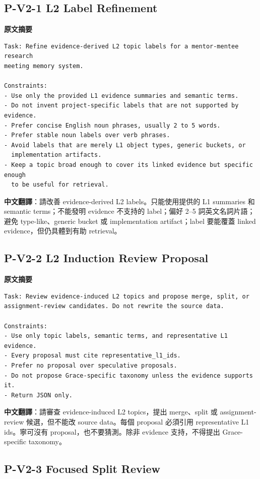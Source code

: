 \documentclass[11pt]{article}
\begin{document}
\subsection{P-V2-1 L2 Label Refinement}

\textbf{原文摘要}
\begin{Verbatim}
Task: Refine evidence-derived L2 topic labels for a mentor-mentee research
meeting memory system.

Constraints:
- Use only the provided L1 evidence summaries and semantic terms.
- Do not invent project-specific labels that are not supported by evidence.
- Prefer concise English noun phrases, usually 2 to 5 words.
- Prefer stable noun labels over verb phrases.
- Avoid labels that are merely L1 object types, generic buckets, or
  implementation artifacts.
- Keep a topic broad enough to cover its linked evidence but specific enough
  to be useful for retrieval.
\end{Verbatim}

\textbf{中文翻譯}：請改善 evidence-derived L2 labels。只能使用提供的 L1 summaries 和 semantic terms；不能發明 evidence 不支持的 label；偏好 2--5 詞英文名詞片語；避免 type-like、generic bucket 或 implementation artifact；label 要能覆蓋 linked evidence，但仍具體到有助 retrieval。

\subsection{P-V2-2 L2 Induction Review Proposal}

\textbf{原文摘要}
\begin{Verbatim}
Task: Review evidence-induced L2 topics and propose merge, split, or
assignment-review candidates. Do not rewrite the source data.

Constraints:
- Use only topic labels, semantic terms, and representative L1 evidence.
- Every proposal must cite representative_l1_ids.
- Prefer no proposal over speculative proposals.
- Do not propose Grace-specific taxonomy unless the evidence supports it.
- Return JSON only.
\end{Verbatim}

\textbf{中文翻譯}：請審查 evidence-induced L2 topics，提出 merge、split 或 assignment-review 候選，但不能改 source data。每個 proposal 必須引用 representative L1 ids。寧可沒有 proposal，也不要猜測。除非 evidence 支持，不得提出 Grace-specific taxonomy。

\subsection{P-V2-3 Focused Split Review}
\end{document}
